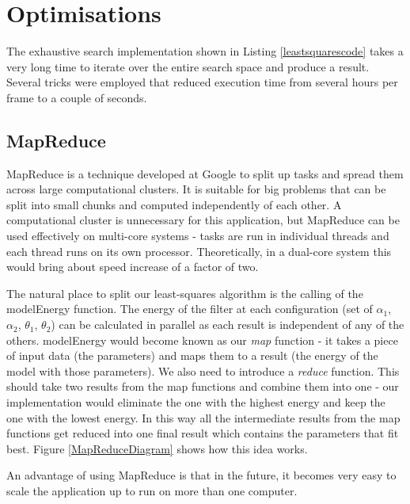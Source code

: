 \section{Optimisations}

The exhaustive search implementation shown in Listing \ref{leastsquarescode} takes a very long time to iterate over the entire search space and produce a result.
Several tricks were employed that reduced execution time from several hours per frame to a couple of seconds.

\subsection{MapReduce}

MapReduce \cite{MapReduce} is a technique developed at Google to split up tasks and spread them across large computational clusters.
It is suitable for big problems that can be split into small chunks and computed independently of each other.
A computational cluster is unnecessary for this application, but MapReduce can be used effectively on multi-core systems - tasks are run in individual threads and each thread runs on its own processor.
Theoretically, in a dual-core system this would bring about speed increase of a factor of two.

The natural place to split our least-squares algorithm is the calling of the modelEnergy function.
The energy of the filter at each configuration (set of $\alpha_1$, $\alpha_2$, $\theta_1$, $\theta_2$) can be calculated in parallel as each result is independent of any of the others.
modelEnergy would become known as our \emph{map} function - it takes a piece of input data (the parameters) and maps them to a result (the energy of the model with those parameters).
We also need to introduce a \emph{reduce} function.
This should take two results from the map functions and combine them into one - our implementation would eliminate the one with the highest energy and keep the one with the lowest energy.
In this way all the intermediate results from the map functions get reduced into one final result which contains the parameters that fit best.
Figure \ref{MapReduceDiagram} shows how this idea works.

An advantage of using MapReduce is that in the future, it becomes very easy to scale the application up to run on more than one computer.

